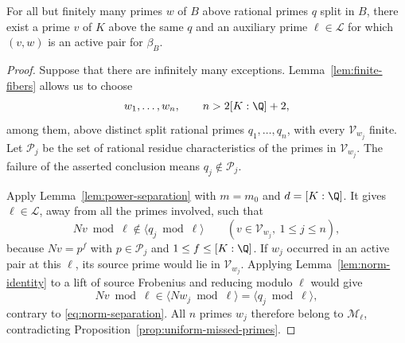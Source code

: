 \begin{proposition}\label{prop:same-characteristic}
For all but finitely many primes $w$ of $B$ above rational primes $q$ split in $B$, there exist a prime $v$ of $K$ above the same $q$ and an auxiliary prime $\ell\in\mathcal L$ for which $(v,w)$ is an active pair for $\beta_B$.
\end{proposition}
\begin{proof}
Suppose that there are infinitely many exceptions. Lemma~\ref{lem:finite-fibers} allows us to choose
\[
 w_1,\ldots,w_n,\qquad n>2[K:\Q]+2,
\]
among them, above distinct split rational primes $q_1,\ldots,q_n$, with every $\mathcal V_{w_j}$ finite. Let $\mathcal P_j$ be the set of rational residue characteristics of the primes in $\mathcal V_{w_j}$. The failure of the asserted conclusion means $q_j\notin\mathcal P_j$.

Apply Lemma~\ref{lem:power-separation} with $m=m_0$ and $d=[K:\Q]$. It gives $\ell\in\mathcal L$, away from all the primes involved, such that
\begin{equation}\label{eq:norm-separation}
 Nv\bmod\ell\notin\langle q_j\bmod\ell\rangle
 \qquad(v\in\mathcal V_{w_j},\ 1\le j\le n),
\end{equation}
because $Nv=p^f$ with $p\in\mathcal P_j$ and $1\le f\le[K:\Q]$. If $w_j$ occurred in an active pair at this $\ell$, its source prime would lie in $\mathcal V_{w_j}$. Applying Lemma~\ref{lem:norm-identity} to a lift of source Frobenius and reducing modulo $\ell$ would give
\[
 Nv\bmod\ell\in\langle Nw_j\bmod\ell\rangle
 =\langle q_j\bmod\ell\rangle,
\]
contrary to \eqref{eq:norm-separation}. All $n$ primes $w_j$ therefore belong to $\mathcal M_\ell$, contradicting Proposition~\ref{prop:uniform-missed-primes}.
\end{proof}
